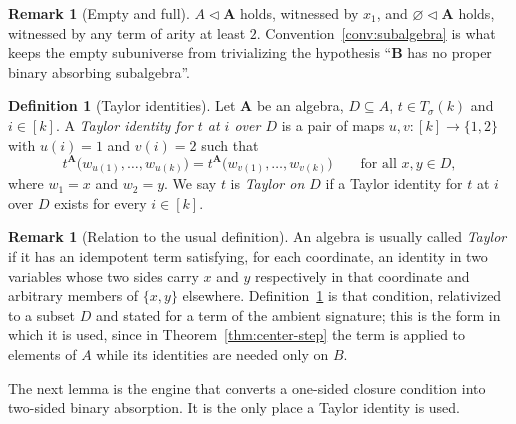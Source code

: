 \documentclass[11pt]{article}
\theoremstyle{mainplain}
\theoremstyle{mainroman}
\theoremstyle{definition}
\newtheorem{definition}[theorem]{Definition}
\newtheorem{remark}[theorem]{Remark}
\numberwithin{equation}{section}
\newcommand{\bA}{\mathbf A}
\newcommand{\bB}{\mathbf B}
\newcommand{\ab}{\lhd}
\newcommand{\Tm}{T_\sigma}
\begin{document}
\begin{remark}[Empty and full]\label{rem:absorption-degenerate}
$A\ab\bA$ holds, witnessed by $x_1$, and $\varnothing\ab\bA$ holds, witnessed
by any term of arity at least $2$. Convention~\ref{conv:subalgebra} is what
keeps the empty subuniverse from trivializing the hypothesis ``$\bB$ has no
proper binary absorbing subalgebra''.
\end{remark}

\begin{definition}[Taylor identities]\label{def:taylor}
Let $\bA$ be an algebra, $D\subseteq A$, $t\in\Tm(k)$ and $i\in[k]$. A
\emph{Taylor identity for $t$ at $i$ over $D$} is a pair of maps
$u,v:[k]\to\{1,2\}$ with $u(i)=1$ and $v(i)=2$ such that
\[
 t^{\bA}\bigl(w_{u(1)},\dots,w_{u(k)}\bigr)
 =t^{\bA}\bigl(w_{v(1)},\dots,w_{v(k)}\bigr)
 \qquad\text{for all }x,y\in D,
\]
where $w_1=x$ and $w_2=y$. We say $t$ is \emph{Taylor on $D$} if a Taylor
identity for $t$ at $i$ over $D$ exists for every $i\in[k]$.
\end{definition}

\begin{remark}[Relation to the usual definition]\label{rem:taylor-usual}
An algebra is usually called \emph{Taylor} if it has an idempotent term
satisfying, for each coordinate, an identity in two variables whose two sides
carry $x$ and $y$ respectively in that coordinate and arbitrary members of
$\{x,y\}$ elsewhere. Definition~\ref{def:taylor} is that condition, relativized
to a subset $D$ and stated for a term of the ambient signature; this is the
form in which it is used, since in Theorem~\ref{thm:center-step} the term is
applied to elements of $A$ while its identities are needed only on $B$.
\end{remark}

The next lemma is the engine that converts a one-sided closure condition into
two-sided binary absorption. It is the only place a Taylor identity is used.
\end{document}
